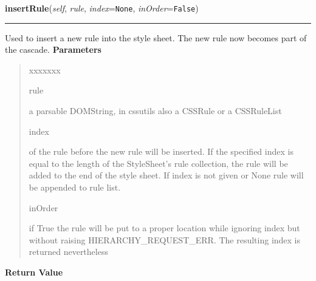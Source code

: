     \label{cssutils:css:cssstylesheet:CSSStyleSheet:insertRule}

    \vspace{0.5ex}

\hspace{.8\funcindent}\begin{boxedminipage}{\funcwidth}

    \raggedright \textbf{insertRule}(\textit{self}, \textit{rule}, \textit{index}={\tt None}, \textit{inOrder}={\tt False})

    \vspace{-1.5ex}

    \rule{\textwidth}{0.5\fboxrule}
\setlength{\parskip}{2ex}

Used to insert a new rule into the style sheet. The new rule now
becomes part of the cascade.
\setlength{\parskip}{1ex}
      \textbf{Parameters}
      \vspace{-1ex}

      \begin{quote}
        \begin{Ventry}{xxxxxxx}

          \item[rule]


a parsable DOMString, in cssutils also a CSSRule or a
CSSRuleList
          \item[index]


of the rule before the new rule will be inserted.
If the specified index is equal to the length of the
StyleSheet's rule collection, the rule will be added to the end
of the style sheet.
If index is not given or None rule will be appended to rule
list.
          \item[inOrder]


if True the rule will be put to a proper location while
ignoring index but without raising HIERARCHY{\_}REQUEST{\_}ERR.
The resulting index is returned nevertheless
        \end{Ventry}

      \end{quote}

      \textbf{Return Value}
    \vspace{-1ex}

      \begin{quote}


\end{quote}
\end{boxedminipage}
